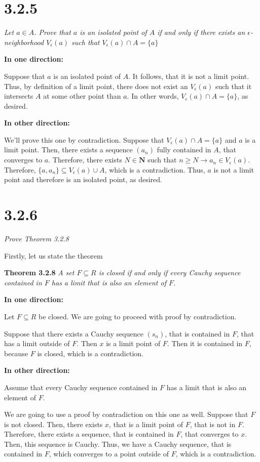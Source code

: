 \documentclass[11pt,oneside,titlepage]{article}
\begin{document}
\section*{3.2.5}
\textit{Let $a \in A$. Prove that $a$ is an isolated point of $A$ if and only
  if there exists an $\epsilon$-neighborhood $V_\epsilon(a)$ such that
  $V_\epsilon(a) \cap A = \{a\}$ }

\textbf{In one direction:}

Suppose that $a$ is an isolated point of $A$. It follows, that it is not a
limit point. Thus, by definition of a limit point, there does not exist an
$V_\epsilon(a)$ such that it intersects $A$ at some other point than $a$.
In other words, $V_\epsilon(a) \cap A = \{a\}$, as desired.

\textbf{In other direction:}

We'll prove this one by contradiction. Suppose that
$V_\epsilon(a) \cap A = \{a\}$ and $a$ is a limit point. Then, there exists
a sequence $(a_n)$ fully contained in $A$, that converges to $a$. Therefore,
there exists $N \in \textbf{N}$ such that $n \geq N \to a_n \in V_\epsilon(a)$.
Therefore, $\{a, a_n\} \subseteq V_\epsilon(a) \cup A$, which is a
contradiction. Thus, $a$ is not a limit point and therefore is an isolated
point, as desired.

\section*{3.2.6}

\textit{Prove Theorem 3.2.8}

Firstly, let us state the theorem

\textbf{Theorem 3.2.8}
\textit{A set $F \subseteq R$ is closed if and only if every Cauchy sequence
  contained in $F$ has a limit that is also an element of $F$. }

\textbf{In one direction:}

Let  $F \subseteq R$ be closed. We are going to proceed with proof by
contradiction.

Suppose that there exists a Cauchy sequence $(s_n)$, that is contained in $F$,
that has a limit outside of $F$. Then $x$ is a limit point of $F$. Then it is
contained in $F$, because $F$ is closed, which is a contradiction.

\textbf{In other direction:}

Assume that every Cauchy sequence  contained in $F$ has a limit
that is also an element of $F$.

We are going to use a proof by contradiction on this one as well. Suppose that
$F$ is not closed. Then, there exists $x$, that is a limit point of $F$, that
is not in $F$. Therefore, there exists a sequence, that is contained in $F$,
that converges to $x$. Then, this sequence is Cauchy. Thus, we have a Cauchy
sequence, that is contained in $F$, which converges to a point outside of $F$,
which is a contradiction.
\end{document}
